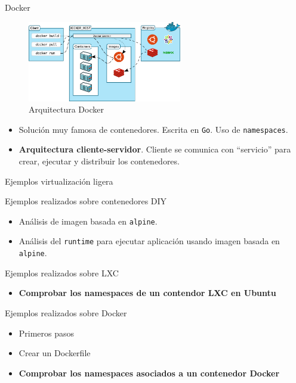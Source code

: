 \documentclass[aspectratio=169,xcolor=dvipsnames]{beamer}
\begin{document}
	\begin{frame}{Docker}
	    \begin{figure}[h]
        \includegraphics[width=0.6\textwidth]{img/architecture-docker.png}
        \caption{Arquitectura Docker}
        \end{figure}
	    
	    \begin{itemize}
	        \item Solución muy famosa de contenedores. Escrita en \texttt{Go}. Uso de \texttt{namespaces}.
	        \item \textbf{Arquitectura cliente-servidor}. Cliente se comunica con ``servicio'' para crear, ejecutar y distribuir los contenedores. 
	    \end{itemize}
	\end{frame}

    \begin{frame}{Ejemplos virtualización ligera}
        \begin{alertblock}{Ejemplos realizados sobre contenedores DIY}
            \begin{itemize}
                \item Análisis de imagen basada en \texttt{alpine}.
                \item Análisis del \texttt{runtime} para ejecutar aplicación usando imagen basada en \texttt{alpine}.
            \end{itemize}
        \end{alertblock}
        
        \begin{alertblock}{Ejemplos realizados sobre LXC}
	        \begin{itemize}
	            \item \textbf{Comprobar los namespaces de un contendor LXC en Ubuntu}
	        \end{itemize}
	    \end{alertblock}
    
         \begin{alertblock}{Ejemplos realizados sobre Docker}
	        \begin{itemize}
	            \item Primeros pasos
	            \item Crear un Dockerfile
	            \item \textbf{Comprobar los namespaces asociados a un contenedor Docker}
	        \end{itemize}
	    \end{alertblock}
    \end{frame}
    
\end{document}
